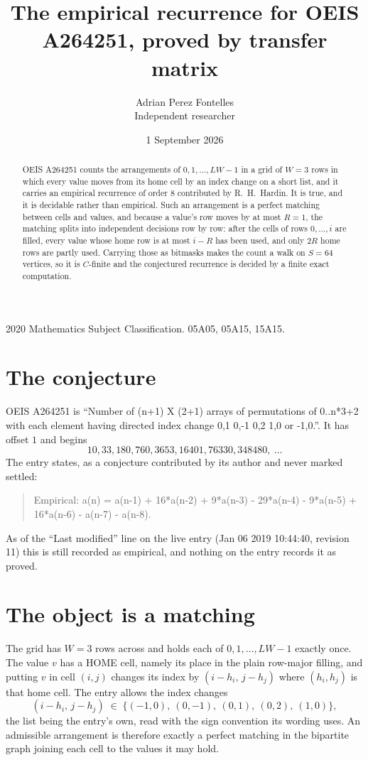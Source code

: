 \documentclass[11pt,a4paper]{article}
\title{The empirical recurrence for OEIS A264251, proved by transfer matrix}
\author{Adrian Perez Fontelles\\ \small Independent researcher}
\date{1 September 2026}
\theoremstyle{plain}
\theoremstyle{definition}
\begin{document}
\maketitle

\begin{abstract}
OEIS A264251 counts the arrangements of $0,1,\dots,LW-1$ in a grid of $W=3$ rows in which
every value moves from its home cell by an index change on a short list, and it carries an
empirical recurrence of order $8$ contributed by R.~H.~Hardin. It is true, and it is
decidable rather than empirical. Such an arrangement is a perfect matching between cells and
values, and because a value's row moves by at most $R=1$, the matching splits into
independent decisions row by row: after the cells of rows $0,\dots,i$ are filled,
every value whose home row is at most $i-R$ has been used, and only $2R$ home rows are
partly used. Carrying those as bitmasks makes the count a walk on $S=64$ vertices, so it is
$C$-finite and the conjectured recurrence is decided by a finite exact computation.
\end{abstract}

\noindent\small 2020 Mathematics Subject Classification. 05A05, 05A15, 15A15.\normalsize

\section{The conjecture}

OEIS A264251 is ``Number of (n+1) X (2+1) arrays of permutations of 0..n*3+2 with each element having directed index change 0,1 0,-1 0,2 1,0 or -1,0.''. It has offset $1$ and begins
\[
10, 33, 180, 760, 3653, 16401, 76330, 348480,\ \dots
\]
The entry states, as a conjecture contributed by its author and never marked settled:
\begin{quote}
Empirical: a(n) = a(n-1) + 16*a(n-2) + 9*a(n-3) - 29*a(n-4) - 9*a(n-5) + 16*a(n-6) - a(n-7) - a(n-8).
\end{quote}
As of the ``Last modified'' line on the live entry (Jan 06 2019 10:44:40, revision 11) this is still
recorded as empirical, and nothing on the entry records it as proved.

\section{The object is a matching}

The grid has $W=3$ rows across and holds each of $0,1,\dots,LW-1$ exactly once. The value
$v$ has a HOME cell, namely its place in the plain row-major filling, and putting $v$ in cell
$(i,j)$ changes its index by $(i-h_i,\,j-h_j)$ where $(h_i,h_j)$ is that home cell. The entry
allows the index changes
\[
(i-h_i,\,j-h_j)\;\in\;\{(-1,0),\ (0,-1),\ (0,1),\ (0,2),\ (1,0)\},
\]
the list being the entry's own, read with the sign convention its wording uses. An admissible
arrangement is therefore exactly a perfect matching in the bipartite graph joining each cell to
the values it may hold.
\end{document}
